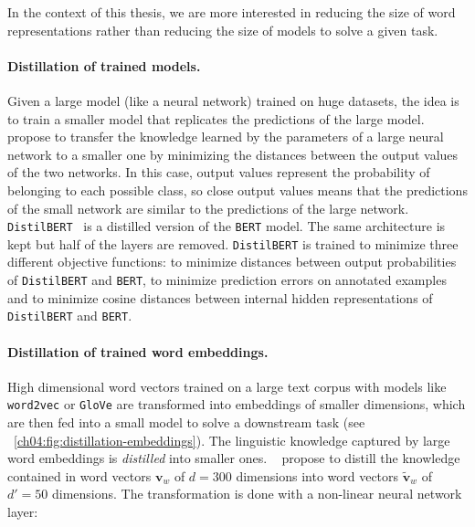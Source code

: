     In the context of this thesis, we are more interested in reducing the size
    of word representations rather than reducing the size of models to solve a
    given task.

    \paragraph{Distillation of trained models.} Given a large model (like a
      neural network) trained on huge datasets, the idea is to train a smaller
      model that replicates the predictions of the large model.
      \citeauthor{hinton2015distilling}~\citep{hinton2015distilling} propose to
      transfer the knowledge learned by the parameters of a large neural network
      to a smaller one by minimizing the distances between the output values of
      the two networks. In this case, output values represent the probability of
      belonging to each possible class, so close output values means that
      the predictions of the small network are similar to the predictions of the large
      network.  \texttt{DistilBERT}~\citep{sanh2019distilbert} is a distilled
      version of the \texttt{BERT} model. The same architecture is kept but half
      of the layers are removed.  \texttt{DistilBERT} is trained to minimize
      three different objective functions: to minimize distances between output
      probabilities of \texttt{DistilBERT} and \texttt{BERT}, to minimize
      prediction errors on annotated examples and to minimize cosine distances
      between internal hidden representations of \texttt{DistilBERT} and
      \texttt{BERT}.

    \paragraph{Distillation of trained word embeddings.} High dimensional word
      vectors trained on a large text corpus with models like \texttt{word2vec}
      or \texttt{GloVe} are transformed into embeddings of smaller dimensions,
      which are then fed into a small model to solve a downstream task (see
      ~\autoref{ch04:fig:distillation-embeddings}). The linguistic knowledge
      captured by large word embeddings is \textit{distilled} into smaller ones.
      \citeauthor{mou2016distilling}~\citep{mou2016distilling} propose to
      distill the knowledge contained in word vectors $\mathbf{v}_w$ of $d=300$
      dimensions into word vectors $\widetilde{\mathbf{v}}_w$ of $d'=50$
      dimensions. The transformation is done with a non-linear neural network
      layer:

